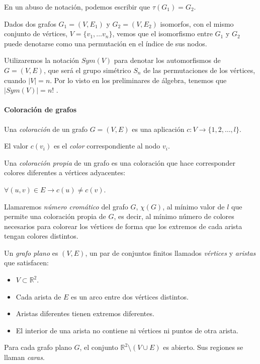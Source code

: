 En un abuso de notación, podemos escribir que $\tau(G_1) = G_2$.


\hfil

Dados dos grafos $G_1 = (V, E_1)$ y $G_2 = (V, E_2)$ isomorfos, con el mismo conjunto de vértices, $V=\{v_1,\dots v_n\}$, vemos que el isomorfismo entre $G_1$ y $G_2$ puede denotarse como una permutación en el índice de sus nodos.

Utilizaremos la notación $Sym(V)$ para denotar los automorfismos de $G=(V,E)$, que será el grupo simétrico $S_n$ de las permutaciones de los vértices, cuando $\mid V \mid=n$. Por lo visto en los preliminares de álgebra, tenemos que $\mid Sym(V) \mid = n!$ .





\hfil


\paragraph{Coloración de grafos}
\hfil

\begin{definition}
	Una \textit{coloración} de un grafo $G=(V,E)$ es una aplicación $c:V\rightarrow \{1,2,\dots , l\}$.

	El valor $c(v_i)$ es el \textit{color} correspondiente al nodo $v_i$.
\end{definition}

\begin{definition}
	Una \textit{coloración propia} de un grafo es una coloración que hace corresponder colores diferentes a vértices adyacentes:

	$\forall (u,v)\in E \to c(u)\neq c(v)$.
\end{definition}


\begin{definition}
	Llamaremos \textit{número cromático} del grafo $G$, $\chi(G)$, al mínimo valor de $l$ que permite una coloración propia de $G$, es decir, al mínimo número de colores necesarios para colorear los vértices de forma que los extremos de cada arista tengan colores distintos.
\end{definition}


\begin{definition}
	Un \textit{grafo plano} es $(V,E)$, un par de conjuntos finitos llamados \textit{vértices} y \textit{aristas} que satisfacen:
	\begin{itemize}
		\item $V \subset \mathbb{R}^2$.
		\item Cada arista de $E$ es un arco entre dos vértices distintos.
		\item Aristas diferentes tienen extremos diferentes.
		\item El interior de una arista no contiene ni vértices ni puntos de otra arista.
	\end{itemize}

	Para cada grafo plano $G$, el conjunto $\mathbb{R}^2\setminus (V\cup E) $ es abierto. Sus regiones se llaman \textit{caras}.
\end{definition}


